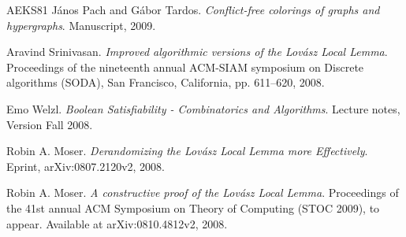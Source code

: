 \documentclass[11pt,a4paper]{article}
\begin{document}
\begin{thebibliography}{AEKS81}
J\'anos Pach and G\'abor Tardos.
\emph{Conflict-free colorings of graphs and hypergraphs}. Manuscript, 2009.

Aravind Srinivasan.
\emph{Improved algorithmic versions of the Lov\'asz Local Lemma}.
Proceedings of the nineteenth annual ACM-SIAM symposium on Discrete algorithms (SODA),
San Francisco, California, pp. 611--620, 2008.

Emo Welzl.
\emph{Boolean Satisfiability - Combinatorics and Algorithms}.
Lecture notes, Version Fall 2008.

Robin A. Moser.
\emph{Derandomizing the Lov\'asz Local Lemma more Effectively}.
Eprint, arXiv:0807.2120v2, 2008.

Robin A. Moser.
\emph{A constructive proof of the Lov\'asz Local Lemma}.
Proceedings of the 41st annual ACM Symposium on Theory of Computing (STOC
2009), to appear. Available at arXiv:0810.4812v2, 2008.

\end{thebibliography}
\end{document}
